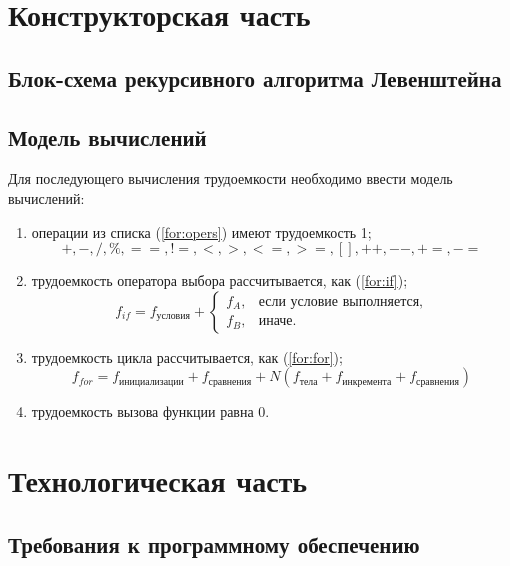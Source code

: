 \documentclass[12pt]{report}
\begin{document}
\newpage

\chapter{Конструкторская часть}
\section{Блок-схема рекурсивного алгоритма Левенштейна}

\section{Модель вычислений}

Для последующего вычисления трудоемкости необходимо ввести модель вычислений:
\begin{enumerate}
    \item операции из списка (\ref{for:opers}) имеют трудоемкость 1;
        \begin{equation}
            \label{for:opers}
            +, -, /, \%, ==, !=, <, >, <=, >=, [], ++, {-}-, +=, -=
        \end{equation}
    \item трудоемкость оператора выбора  рассчитывается, как (\ref{for:if});
	\begin{equation}
        \label{for:if}
        f_{if} = f_{\text{условия}} +
        \begin{cases}
        f_A, & \text{если условие выполняется,}\\
        f_B, & \text{иначе.}
        \end{cases}
	\end{equation}
\item трудоемкость цикла рассчитывается, как (\ref{for:for});
    \begin{equation}
        \label{for:for}
        f_{for} = f_{\text{инициализации}} + f_{\text{сравнения}} + N(f_{\text{тела}} + f_{\text{инкремента}} + f_{\text{сравнения}})
    \end{equation}
	\item трудоемкость вызова функции равна 0.
\end{enumerate}


\chapter{Технологическая часть}
\section{Требования к программному обеспечению}
\end{document}
